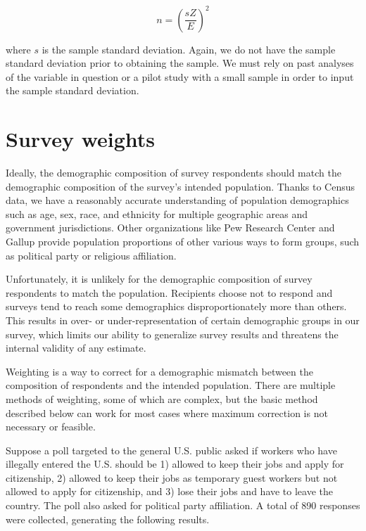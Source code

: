 \documentclass[
]{book}
\begin{document}
\begin{equation}
n=(\frac{sZ}{E})^2
\label{eq:sampsizemean}
\end{equation}

where \(s\) is the sample standard deviation. Again, we do not have the sample standard deviation prior to obtaining the sample. We must rely on past analyses of the variable in question or a pilot study with a small sample in order to input the sample standard deviation.

\hypertarget{survey-weights}{%
\section{Survey weights}\label{survey-weights}}

Ideally, the demographic composition of survey respondents should match the demographic composition of the survey's intended population. Thanks to Census data, we have a reasonably accurate understanding of population demographics such as age, sex, race, and ethnicity for multiple geographic areas and government jurisdictions. Other organizations like Pew Research Center and Gallup provide population proportions of other various ways to form groups, such as political party or religious affiliation.

Unfortunately, it is unlikely for the demographic composition of survey respondents to match the population. Recipients choose not to respond and surveys tend to reach some demographics disproportionately more than others. This results in over- or under-representation of certain demographic groups in our survey, which limits our ability to generalize survey results and threatens the internal validity of any estimate.

Weighting is a way to correct for a demographic mismatch between the composition of respondents and the intended population. There are multiple methods of weighting, some of which are complex, but the basic method described below can work for most cases where maximum correction is not necessary or feasible.

Suppose a poll targeted to the general U.S. public asked if workers who have illegally entered the U.S. should be 1) allowed to keep their jobs and apply for citizenship, 2) allowed to keep their jobs as temporary guest workers but not allowed to apply for citizenship, and 3) lose their jobs and have to leave the country. The poll also asked for political party affiliation. A total of 890 responses were collected, generating the following results.
\end{document}
